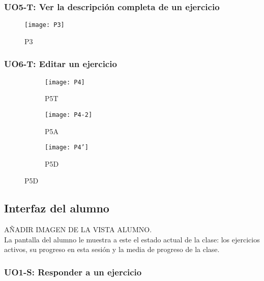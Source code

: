 \subsubsection{UO5-T: Ver la descripción completa de un ejercicio}
\label{diseno-e-implementacion:interfaces:profesor:uo5-t}

\begin{figure}[H]
	\centering
	\texttt{[image: P3]}
	\caption{P3}
	\label{diseno-e-implementacion:interfaces:profesor:uo5-t:p3}
\end{figure}

\subsubsection{UO6-T: Editar un ejercicio}
\label{diseno-e-implementacion:interfaces:profesor:uo6-t}

\begin{figure}[H]
\begin{subfigure}[b]{0.3\textwidth}
	\centering
	\texttt{[image: P4]}
	\caption{P5T}
	\label{fig:req-autenticacion:p0}
\end{subfigure}
%
\begin{subfigure}[b]{0.3\textwidth}
	\centering
	\texttt{[image: P4-2]}
	\caption{P5A}
	\label{fig:req-autenticacion:p0'}
\end{subfigure}
%
\begin{subfigure}[b]{0.3\textwidth}
	\centering
	\texttt{[image: P4']}
	\caption{P5D}
	\label{fig:fsm-autenticacion}
\end{subfigure}

\label{fig:autenticacion}
\end{figure}

\subsection{Interfaz del alumno}
\label{diseno-e-implementacion:interfaces:alumno}

AÑADIR IMAGEN DE LA VISTA ALUMNO.\\

La pantalla del alumno le muestra a este el estado actual de la clase: los ejercicios activos, su progreso en esta sesión y la media de progreso de la clase.

\subsubsection{UO1-S: Responder a un ejercicio}
\label{diseno-e-implementacion:interfaces:alumno:uo1-s}

